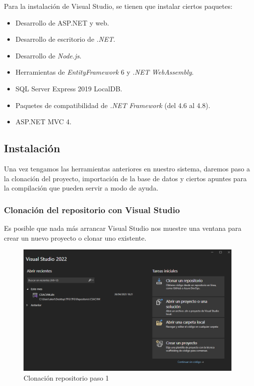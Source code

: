 Para la instalación de Visual Studio, se tienen que instalar ciertos paquetes:
\begin{itemize}
\tightlist
    \item Desarrollo de ASP.NET y web.
    \item Desarrollo de escritorio de \emph{.NET}.
    \item Desarrollo de \emph{Node.js}.
    \item Herramientas de \emph{EntityFramework} 6 y \emph{.NET WebAssembly}.
    \item SQL Server Express 2019 LocalDB.
    \item Paquetes de compatibilidad de \emph{.NET Framework} (del 4.6 al 4.8).
    \item ASP.NET MVC 4.
\end{itemize}

\subsection{Instalación}
Una vez tengamos las herramientas anteriores en nuestro sistema, daremos paso a la clonación del proyecto, importación de la base de datos y ciertos apuntes para la compilación que pueden servir a modo de ayuda.

\subsubsection{Clonación del repositorio con Visual Studio}
Es posible que nada más arrancar Visual Studio nos muestre una ventana para crear un nuevo proyecto o clonar uno existente.

\begin{figure}
    \centering
    \includegraphics[width=\linewidth]{img/ManualProgramador/ClonacionP1.png}
    \caption{Clonación repositorio paso 1}
    
\end{figure}

